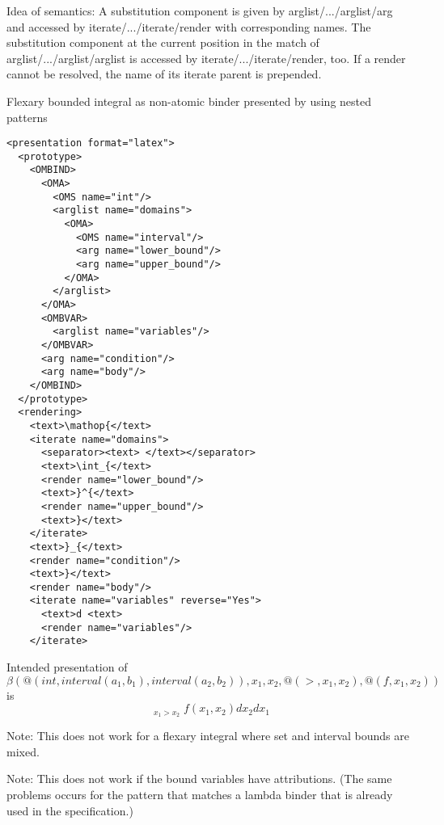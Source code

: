 \documentclass{article}
\begin{document}
Idea of semantics: A substitution component is given by arglist/.../arglist/arg and accessed by iterate/.../iterate/render with corresponding names. The substitution component at the current position in the match of arglist/.../arglist/arglist is accessed by iterate/.../iterate/render, too. If a render cannot be resolved, the name of its iterate parent is prepended.

Flexary bounded integral as non-atomic binder presented by using nested patterns


\begin{lstlisting}
<presentation format="latex">
  <prototype>
    <OMBIND>
      <OMA>
        <OMS name="int"/>
        <arglist name="domains">
          <OMA>
            <OMS name="interval"/>
            <arg name="lower_bound"/>
            <arg name="upper_bound"/>
          </OMA>
        </arglist>
      </OMA>
      <OMBVAR>
        <arglist name="variables"/>
      </OMBVAR>
      <arg name="condition"/>
      <arg name="body"/>
    </OMBIND>
  </prototype>
  <rendering>
    <text>\mathop{</text>
    <iterate name="domains">
      <separator><text> </text></separator>
      <text>\int_{</text>
      <render name="lower_bound"/>
      <text>}^{</text>
      <render name="upper_bound"/>
      <text>}</text>
    </iterate>
    <text>}_{</text>
    <render name="condition"/>
    <text>}</text>
    <render name="body"/>
    <iterate name="variables" reverse="Yes">
      <text>d <text>
      <render name="variables"/>
    </iterate>
\end{lstlisting}

Intended presentation of \[\beta(@(int,interval(a_1,b_1),interval(a_2,b_2)),x_1,x_2,@(>,x_1,x_2),@(f,x_1,x_2))\] is
\[\mathop{\int_{a_1}^{b_1}\int_{a_2}^{b_2}}_{x_1>x_2}f(x_1,x_2)d x_2 d x_1\]

Note: This does not work for a flexary integral where set and interval bounds are mixed.

Note: This does not work if the bound variables have attributions. (The same problems occurs for the pattern that matches a lambda binder that is already used in the specification.)
\end{document}
